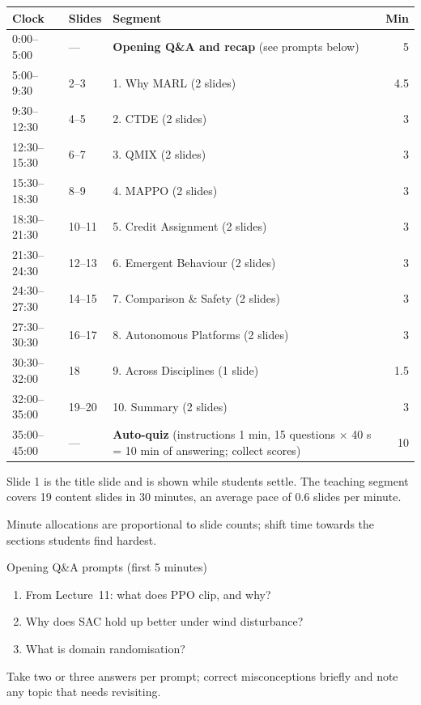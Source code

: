 \documentclass[11pt]{article}
\begin{document}
\begin{center}\small\renewcommand{\arraystretch}{1.2}\begin{tabularx}{\textwidth}{@{}l l X r@{}}\toprule\textbf{Clock} & \textbf{Slides} & \textbf{Segment} & \textbf{Min}\\\midrule

0:00--5:00 & --- & \textbf{Opening Q\&A and recap} (see prompts below) & 5\\

5:00--9:30 & 2--3 & 1. Why MARL (2 slides) & 4.5\\

9:30--12:30 & 4--5 & 2. CTDE (2 slides) & 3\\

12:30--15:30 & 6--7 & 3. QMIX (2 slides) & 3\\

15:30--18:30 & 8--9 & 4. MAPPO (2 slides) & 3\\

18:30--21:30 & 10--11 & 5. Credit Assignment (2 slides) & 3\\

21:30--24:30 & 12--13 & 6. Emergent Behaviour (2 slides) & 3\\

24:30--27:30 & 14--15 & 7. Comparison \& Safety (2 slides) & 3\\

27:30--30:30 & 16--17 & 8. Autonomous Platforms (2 slides) & 3\\

30:30--32:00 & 18 & 9. Across Disciplines (1 slide) & 1.5\\

32:00--35:00 & 19--20 & 10. Summary (2 slides) & 3\\

35:00--45:00 & --- & \textbf{Auto-quiz} (instructions 1 min, 15 questions $\times$ 40 s = 10 min of answering; collect scores) & 10\\\bottomrule\end{tabularx}\end{center}

Slide 1 is the title slide and is shown while students settle. The teaching segment covers 19 content slides in 30 minutes, an average pace of 0.6 slides per minute. 

Minute allocations are proportional to slide counts; shift time towards the sections students find hardest.

\begin{instr}{Opening Q\&A prompts (first 5 minutes)}\begin{enumerate}\item From Lecture~11: what does PPO clip, and why?\item Why does SAC hold up better under wind disturbance?\item What is domain randomisation?\end{enumerate}Take two or three answers per prompt; correct misconceptions briefly and note any topic that needs revisiting.\end{instr}
\end{document}
